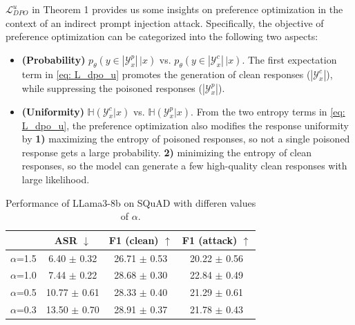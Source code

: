 \documentclass[11pt]{article}
\begin{document}
$\mathcal L^u_{DPO}$ in Theorem 1 provides us some insights on preference optimization in the context of an indirect prompt injection attack. 
Specifically,  the objective of preference optimization can be categorized into the following two aspects:
\begin{itemize}
    \item \textbf{(Probability)} $p_\theta(y\in |\mathcal Y^p_x|\,|x)$ vs. $p_\theta(y\in |\mathcal Y^c_x|\,|x)$.
    The first expectation term in \eqref{eq: L_dpo_u} promotes the generation of clean responses ($|\mathcal Y^c_x|$), while suppressing the poisoned responses ($|\mathcal Y^p_x|$).

    \item \textbf{(Uniformity)}  $\mathbb H(\mathcal Y^c_x|x)$ vs. $\mathbb H(\mathcal Y^p_x|x)$. 
    From the two entropy terms in \eqref{eq: L_dpo_u}, the preference optimization also modifies the response uniformity by \textbf{1)} maximizing the entropy of poisoned responses, so not a single poisoned response gets a large probability.
    \textbf{2)} minimizing the entropy of clean responses, so the model can generate a few high-quality clean responses with large likelihood.
   
\end{itemize}









\begin{table}[t]
\centering
\small
\begin{tabular}{l | c c c}
\toprule
  & \textbf{ASR} $\downarrow$ & \textbf{F1 (clean)} $\uparrow$ & \textbf{F1 (attack)} $\uparrow$ \\
\midrule
{$\alpha$=1.5}    & 6.40 $\pm$ 0.32 & 26.71 $\pm$ 0.53 & 20.22 $\pm$ 0.56 \\
{$\alpha$=1.0}  & 7.44 $\pm$ 0.22 & 28.68 $\pm$ 0.30 & 22.84 $\pm$ 0.49 \\
{$\alpha$=0.5}    & 10.77 $\pm$ 0.61 & 28.33 $\pm$ 0.40 & 21.29 $\pm$ 0.61\\
{$\alpha$=0.3}     & 13.50 $\pm$ 0.70 & 28.91 $\pm$ 0.37 & 21.78 $\pm$ 0.43\\
\bottomrule
\end{tabular}
\caption{Performance of LLama3-8b on SQuAD with differen values of $\alpha$. 
}
\label{tb:mask}
\vspace{-1em}
\end{table}
\end{document}

